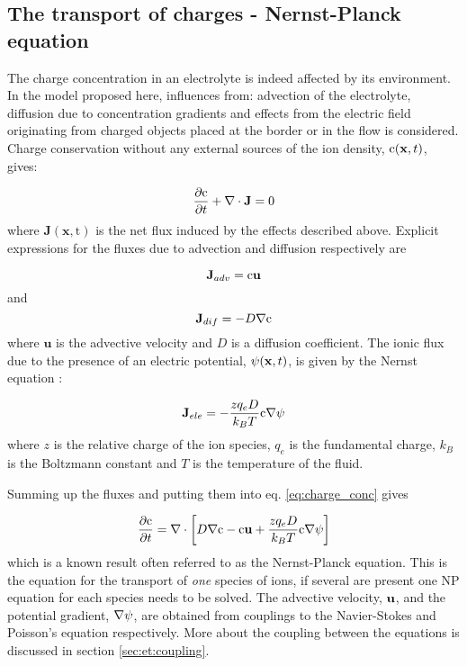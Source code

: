 \subsection{The transport of charges - Nernst-Planck equation}\label{sec:et:np}
The charge concentration in an electrolyte is indeed affected by its
environment. In the model proposed here, influences from: advection of
the electrolyte, diffusion due to concentration gradients and effects
from the electric field originating from charged objects placed at the
border or in the flow is considered. Charge conservation without any
external sources of the ion density, $\mathrm{c}(\mathbf{x}, t)$, gives:

\begin{equation}\label{eq:charge_conc}
\dfrac{\partial \mathrm{c}}{\partial t} + \nabla \cdot \mathbf{J} = 0
\end{equation}
where $\mathbf{J(\mathbf{x}, \mathrm{t})}$ is the net flux induced
by the effects described above. Explicit expressions for the fluxes
due to advection and diffusion respectively are 

\begin{equation}
\mathbf{J}_{adv} =
\mathrm{c}\mathbf{u}
\end{equation}
and 
\begin{equation}
\mathbf{J}_{dif} = -D\nabla \mathrm{c} 
\end{equation}
where $\mathbf{u}$ is the advective velocity and $D$ is a diffusion
coefficient. The ionic flux due to the presence of an electric
potential, $\mathrm{\psi}(\mathbf{x}, t)$, is given by the Nernst equation
\cite{dongquing-ren-book}:

\begin{equation}
\mathbf{J}_{ele} = -\frac{zq_eD}{k_BT}\mathrm{c}\nabla\mathrm{\psi}
\end{equation}
where $z$ is the relative charge of the ion species, $q_e$ is the
fundamental charge, $k_B$ is the Boltzmann constant and $T$ is the
temperature of the fluid.

Summing up the fluxes and putting them into eq. \eqref{eq:charge_conc}
gives

\begin{equation}\label{eq:et:np}
\dfrac{\partial \mathrm{c}}{\partial t} = \nabla \cdot \left [
 D\nabla \mathrm{c} - \mathrm{c}\mathbf{u} + \frac{zq_eD}{k_BT}\mathrm{c}\nabla\mathrm{\psi}
\right]
\end{equation}
which is a known result often referred to as the Nernst-Planck
equation. This is the equation for the transport of \emph{one} species
of ions, if several are present one NP equation for each species needs
to be solved. The advective velocity, $\mathbf{u}$, and the potential
gradient, $\nabla \mathrm{\psi}$, are obtained from couplings to the
Navier-Stokes and Poisson's equation respectively. More about the
coupling between the equations is discussed in section
\ref{sec:et:coupling}.

